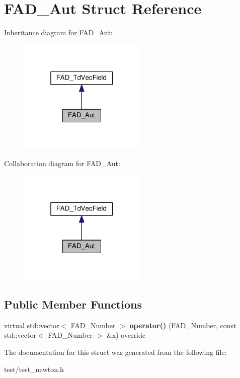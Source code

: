 \hypertarget{structFAD__Aut}{}\section{F\+A\+D\+\_\+\+Aut Struct Reference}
\label{structFAD__Aut}


Inheritance diagram for F\+A\+D\+\_\+\+Aut\+:\nopagebreak
\begin{figure}[H]
\begin{center}
\leavevmode
\includegraphics[width=172pt]{structFAD__Aut__inherit__graph}
\end{center}
\end{figure}


Collaboration diagram for F\+A\+D\+\_\+\+Aut\+:\nopagebreak
\begin{figure}[H]
\begin{center}
\leavevmode
\includegraphics[width=172pt]{structFAD__Aut__coll__graph}
\end{center}
\end{figure}
\subsection*{Public Member Functions}
\begin{DoxyCompactItemize}
\item 
\mbox{\label{structFAD__Aut_a43681bee9505bdf66d394f3341bb0462}} 
virtual std\+::vector$<$ F\+A\+D\+\_\+\+Number $>$ {\bfseries operator()} (F\+A\+D\+\_\+\+Number, const std\+::vector$<$ F\+A\+D\+\_\+\+Number $>$ \&x) override
\end{DoxyCompactItemize}


The documentation for this struct was generated from the following file\+:\begin{DoxyCompactItemize}
\item 
test/test\+\_\+newton.\+h\end{DoxyCompactItemize}

